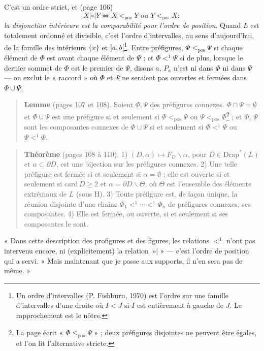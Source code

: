 \documentclass[11pt,a4paper]{article}
\begin{document}
C'est un ordre strict, et (page 106)
\[
X \mathrel{|\circ|} Y \iff X <_{\mathrm{pos}} Y \text{ ou } Y <_{\mathrm{pos}}
X :
\]
\emph{la disjonction intérieure est la comparabilité pour l'ordre de position}.
Quand $L$ est totalement ordonné et divisible, c'est l'ordre d'intervalles,
au sens d'aujourd'hui, de la famille des intérieurs $\{x\}$ et
$]a,b[$\footnote{Un ordre d'intervalles (P. Fishburn, 1970) est l'ordre sur
une famille d'intervalles d'une droite où $I < J$ si $I$ est entièrement à
gauche de $J$. Le rapprochement est le nôtre.}. Entre préfigures, $\Phi
<_{\mathrm{pos}} \Psi$ si chaque élément de $\Phi$ est avant chaque élément de
$\Psi$ ; et $\Phi <^{1} \Psi$ si de plus, lorsque le dernier sommet de $\Phi$
est le premier de $\Psi$, disons $a$, $P_{a}$ n'est ni dans $\Phi$ ni dans
$\Psi$ --- on exclut le « raccord » où $\Phi$ et $\Psi$ ne seraient pas
ouvertes et fermées dans $\Phi \cup \Psi$.

\begin{quote}
\textbf{Lemme} (pages 107 et 108). Soient $\Phi, \Psi$ des préfigures connexes.
$\Phi \cap \Psi = \emptyset$ et $\Phi \cup \Psi$ est une préfigure si et
seulement si $\Phi <_{\mathrm{pos}} \Psi$ ou $\Psi <_{\mathrm{pos}}
\Phi$\footnote{La page écrit « $\Phi \leq_{\mathrm{pos}} \Psi$ » ; deux
préfigures disjointes ne peuvent être égales, et l'on lit l'alternative
stricte.} ; et $\Phi$, $\Psi$ sont les composantes connexes de $\Phi \cup \Psi$
si et seulement si $\Phi <^{1} \Psi$ ou $\Psi <^{1} \Phi$.
\end{quote}

\begin{quote}
\textbf{Théorème} (pages 108 à 110). 1) $(D, \alpha) \mapsto F_{D}
\smallsetminus \alpha$, pour $D \in \mathrm{Drap}^{*}(L)$ et $\alpha \subset
\partial D$, est une bijection sur les préfigures connexes. 2) Une telle
préfigure est fermée si et seulement si $\alpha = \emptyset$ ; elle est ouverte
si et seulement si $\mathrm{card}\, D \geq 2$ et $\alpha = \partial D
\smallsetminus \Theta$, où $\Theta$ est l'ensemble des éléments extrémaux de
$L$ (sous H). 3) Toute préfigure est, de façon unique, la réunion disjointe
d'une chaîne $\Phi_{1} <^{1} \cdots <^{1} \Phi_{n}$ de préfigures connexes, ses
composantes. 4) Elle est fermée, ou ouverte, si et seulement si ses composantes
le sont.
\end{quote}

« Dans cette description des profigures et des figures, les relations $<^{1}$
n'ont pas intervenu encore, ni (explicitement) la relation $\mathrel{|\circ|}$ »
--- c'est l'ordre de position qui a servi. « Mais maintenant que je passe aux
supports, il n'en sera pas de même. »
\end{document}
